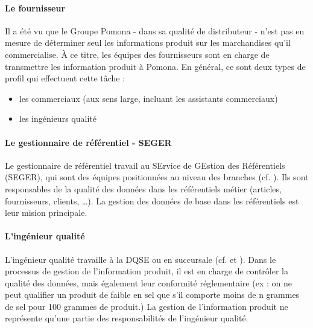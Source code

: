                 \paragraph{Le fournisseur}
                Il a été vu que le Groupe Pomona - dans sa qualité de distributeur - n'est pas en mesure de déterminer seul les informations produit sur les marchandises qu'il commercialise.
                \`{A} ce titre, les équipes des fournisseurs sont en charge de transmettre les information produit à Pomona.
                En général, ce sont deux types de profil qui effectuent cette tâche : 
                \begin{itemize}
                    \item les commerciaux (aux sens large, incluant les assistants commerciaux)
                    \item les ingénieurs qualité
                \end{itemize}

                \paragraph{Le gestionnaire de référentiel - SEGER}
                Le gestionnaire de référentiel travail au SErvice de GEstion des Référentiels (SEGER), qui sont des équipes positionnées au niveau des branches (cf. ).
                Ils sont responsables de la qualité des données dans les référentiels métier (articles, fournisseurs, clients, \dots).
                La gestion des données de base dans les référentiels est leur mision principale.

                \paragraph{L'ingénieur qualité}
                L'ingénieur qualité travaille à la DQSE ou en succursale (cf.  et ).
                Dans le processus de gestion de l'information produit, il est en charge de contrôler la qualité des données, mais également leur conformité réglementaire (ex : on ne peut qualifier un produit de \og faible en sel \fg que s'il comporte moins de n grammes de sel pour 100 grammes de produit.)
                La gestion de l'information produit ne représente qu'une partie des responsabilités de l'ingénieur qualité.

